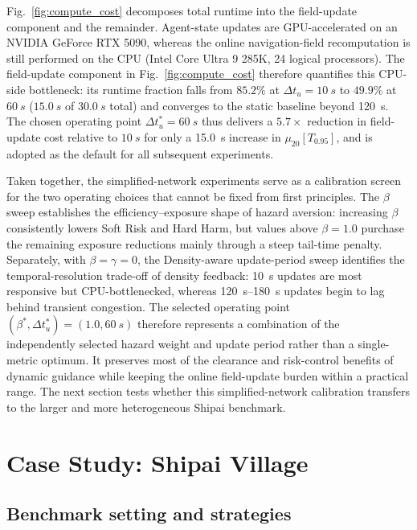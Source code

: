 \documentclass[preprint,12pt]{elsarticle}
\providecommand{\FloatBarrier}{}
\let\origsection\section
\renewcommand{\section}{\FloatBarrier\origsection}
\let\origsubsection\subsection
\renewcommand{\subsection}{\FloatBarrier\origsubsection}
\begin{document}
Fig.~\ref{fig:compute_cost} decomposes total runtime into the
field-update component and the remainder. Agent-state updates are
GPU-accelerated on an NVIDIA GeForce RTX 5090, whereas the online
navigation-field recomputation is still performed on the CPU (Intel Core
Ultra 9 285K, 24 logical processors). The field-update component in
Fig.~\ref{fig:compute_cost} therefore quantifies this CPU-side
bottleneck: its runtime fraction falls from $85.2\%$ at
$\Delta t_u = \SI{10}{s}$ to $49.9\%$ at $\SI{60}{s}$ ($\SI{15.0}{s}$
of $\SI{30.0}{s}$ total) and converges to the static baseline beyond
\SI{120}{s}. The chosen operating point
$\Delta t_u^{*} = \SI{60}{s}$ thus delivers a $5.7\times$ reduction in
field-update cost relative to $\SI{10}{s}$ for only a \SI{15.0}{s}
increase in $\mu_{20}[T_{0.95}]$, and is adopted as the default for all
subsequent experiments.

Taken together, the simplified-network experiments serve as a
calibration screen for the two operating choices that cannot be fixed
from first principles. The $\beta$ sweep establishes the
efficiency--exposure shape of hazard aversion: increasing $\beta$
consistently lowers Soft Risk and Hard Harm, but values above
$\beta=1.0$ purchase the remaining exposure reductions mainly through a steep
tail-time penalty. Separately, with $\beta=\gamma=0$, the
Density-aware update-period sweep identifies the temporal-resolution
trade-off of density feedback: \SI{10}{s} updates are most responsive but
CPU-bottlenecked, whereas \SI{120}{s}--\SI{180}{s} updates begin to lag
behind transient congestion. The selected operating point
$(\beta^{*}, \Delta t_u^{*})=(1.0,\SI{60}{s})$ therefore represents a
combination of the independently selected hazard weight and update
period rather than a single-metric optimum. It preserves most of the
clearance and risk-control benefits of dynamic guidance while keeping
the online field-update burden within a practical range. The
next section tests whether this simplified-network calibration transfers
to the larger and more heterogeneous Shipai benchmark.


\FloatBarrier
\section{Case Study: Shipai Village}
\label{sec:shipai}
\FloatBarrier


\subsection{Benchmark setting and strategies}
\label{sec:shipai_benchmark}
\end{document}
